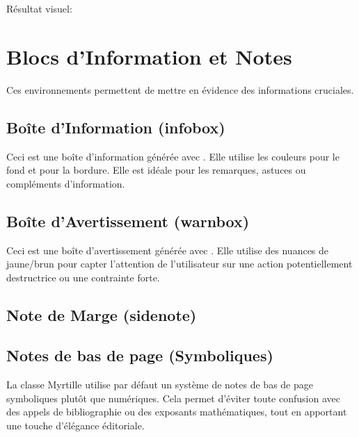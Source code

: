 \documentclass[theme=myrtille]{myrtille}
\begin{document}
\begin{texblock}
\newcommand{\badgePerso}{\badge[customPurple]{Spécial}}
\end{texblock}
Résultat visuel: \badgePerso

\section{Blocs d'Information et Notes}
Ces environnements permettent de mettre en évidence des informations cruciales.

\subsection{Boîte d'Information (infobox)}
\begin{infobox}
Ceci est une boîte d'information générée avec . Elle utilise les couleurs  pour le fond et  pour la bordure. Elle est idéale pour les remarques, astuces ou compléments d'information.
\end{infobox}

\subsection{Boîte d'Avertissement (warnbox)}
\begin{warnbox}
Ceci est une boîte d'avertissement générée avec . Elle utilise des nuances de jaune/brun pour capter l'attention de l'utilisateur sur une action potentiellement destructrice ou une contrainte forte.
\end{warnbox}

\subsection{Note de Marge (sidenote)}

\subsection{Notes de bas de page (Symboliques)}
La classe Myrtille utilise par défaut un système de notes de bas de page symboliques plutôt que numériques. Cela permet d'éviter toute confusion avec des appels de bibliographie ou des exposants mathématiques, tout en apportant une touche d'élégance éditoriale.
\end{document}
